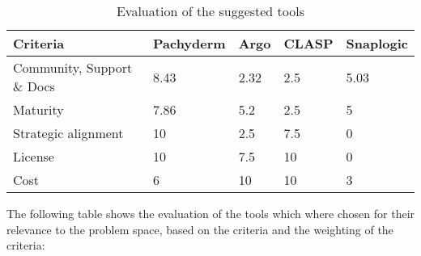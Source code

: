 \begin{table}[htb]
    \centering
    \begin{tabular}{|l|l|l|l|l|} \hline
        \textbf{Criteria}                                          & \textbf{Pachyderm}    & \textbf{Argo}         & \textbf{\ac{CLASP}}   & \textbf{Snaplogic}     \\ \hline
        Community, Support \& Docs                                 & 8.43                   & 2.32                   & 2.5                   & 5.03                   \\ \hline
        Maturity                                                   & 7.86                 & 5.2                   & 2.5                   & 5                   \\ \hline
        Strategic alignment                                        & 10                   & 2.5                   & 7.5                   & 0                    \\ \hline
        License                                                    & 10                    & 7.5                     & 10                    & 0                      \\ \hline
        Cost                                                       & 6                      & 10                    & 10                    & 3                      \\ \hline
    \end{tabular}
    \caption{Evaluation of the suggested tools}
    \label{tab:evaluation_of_the_suggested_tools}
\end{table}

The following table shows the evaluation of the tools which where chosen for their relevance to the problem space, based on the criteria and the weighting of the criteria:

